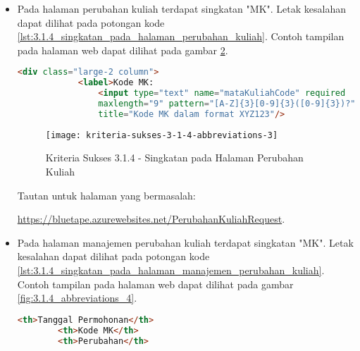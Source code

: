 \begin{itemize}
    \begin{figure}[H]
        \centering  
        \texttt{[image: kriteria-sukses-3-1-4-abbreviations-2]}  
        \caption[Kriteria Sukses 3.1.4 - Singkatan pada Halaman Manajemen Cetak Transkrip]{Kriteria Sukses 3.1.4 - Singkatan pada Halaman Manajemen Cetak Transkrip}
        \label{fig:3.1.4_abbreviations_2}  
    \end{figure}
    Tautan untuk halaman yang bermasalah: \url{https://bluetape.azurewebsites.net/TranskripManage}.

    \item Pada halaman perubahan kuliah terdapat singkatan "MK". Letak kesalahan dapat dilihat pada potongan kode \ref{lst:3.1.4_singkatan_pada_halaman_perubahan_kuliah}. Contoh tampilan pada halaman web dapat dilihat pada gambar \ref{fig:3.1.4_abbreviations_3}.
    \begin{lstlisting}[frame=single, label={lst:3.1.4_singkatan_pada_halaman_perubahan_kuliah}, language=HTML, caption=Kriteria Sukses 3.1.4 - Singkatan pada Halaman Perubahan Kuliah]
        <div class="large-2 column">
            <label>Kode MK:
                <input type="text" name="mataKuliahCode" required 
                maxlength="9" pattern="[A-Z]{3}[0-9]{3}([0-9]{3})?" 
                title="Kode MK dalam format XYZ123"/>
    \end{lstlisting}

    \begin{figure}[H]
        \centering  
        \texttt{[image: kriteria-sukses-3-1-4-abbreviations-3]}  
        \caption[Kriteria Sukses 3.1.4 - Singkatan pada Halaman Perubahan Kuliah]{Kriteria Sukses 3.1.4 - Singkatan pada Halaman Perubahan Kuliah}
        \label{fig:3.1.4_abbreviations_3}  
    \end{figure}
    Tautan untuk halaman yang bermasalah: 
    
    \url{https://bluetape.azurewebsites.net/PerubahanKuliahRequest}.

    \item Pada halaman manajemen perubahan kuliah terdapat singkatan "MK". Letak kesalahan dapat dilihat pada potongan kode \ref{lst:3.1.4_singkatan_pada_halaman_manajemen_perubahan_kuliah}. Contoh tampilan pada halaman web dapat dilihat pada gambar \ref{fig:3.1.4_abbreviations_4}.
    \begin{lstlisting}[frame=single, label={lst:3.1.4_singkatan_pada_halaman_manajemen_perubahan_kuliah}, language=HTML, caption=Kriteria Sukses 3.1.4 - Singkatan pada Halaman Manajemen Perubahan Kuliah]
        <th>Tanggal Permohonan</th>
        <th>Kode MK</th>
        <th>Perubahan</th>
    \end{lstlisting}


\end{itemize}
